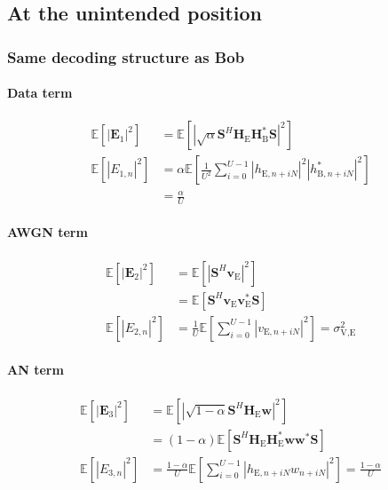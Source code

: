 \documentclass[journal,comsoc]{IEEEtran}
\newcommand{\module}[1]{\left|#1\right|}
\newcommand{\EX}[1]{\mathbb{E} \left[#1\right]}%
\newcommand{\HE}{\textbf{H}_{\text{E}}}
\newcommand{\HB}{\textbf{H}_{\text{B}}}
\newcommand{\ve}{\textbf{v}_{\text{E}}}
\newcommand{\spread}{\textbf{S}}
\newcommand{\w}{\textbf{w}}
\begin{document}
\subsection{At the unintended position}\label{sec:at-the-unintended-position-app}
\subsubsection{Same decoding structure as Bob}\label{sec:same-decoding-structure-as-bob-app}
\paragraph{Data term}\label{sec:data-term-app-1}
\begin{equation}
	\begin{split}
		\EX{|\textbf{E}_{1}|^2} &= \EX{\module{\sqrt{\alpha}\spread^H \HE\HB^* \spread}^2} \\
		\EX{|E_{1,n}|^2}&=\alpha \EX{\frac{1}{U^2} \sum_{i=0}^{U-1} \left| h_{\text{E}, n + iN} \right|^2 \left| h^*_{\text{B}, n + iN}\right|^2 } \\
		&= \frac{\alpha}{U}
	\end{split}
	\label{eq:appA:data_eve_filt0-app}
\end{equation}



\paragraph{AWGN term}\label{sec:awgn-term-app-1}
\begin{equation}
	\begin{split}
		\EX{|\textbf{E}_{2}|^2} &=  \EX{\module{\spread^H \ve}^2} \\
		&=\EX{\spread^H \ve \ve^* \spread } \\
		\EX{|E_{2,n}|^2} &= \frac{1}{U} \EX{\sum_{i=0}^{U-1} |v_{\text{E}, n + iN}|^2} = \sigma^2_{\text{V,E}}
	\end{split}
	\label{eq:appA:noise_eve_filt0-app}
\end{equation}


\paragraph{AN term}\label{sec:an-term-app-1}
\begin{equation}
	\begin{split}
		\EX{|\textbf{E}_{3}|^2} &=  \EX{\module{\sqrt{1-\alpha}\spread^H \HE \w}^2} \\
		&=(1-\alpha)\EX{\spread^H \HE\textbf{H}^*_{\text{E}} \w\w^* \spread } \\
		\EX{|E_{3,n}|^2}  &= \frac{1-\alpha}{U} \EX{\sum_{i=0}^{U-1} |h_{\text{E}, n + iN}w_{n + iN}|^2} = \frac{1-\alpha}{U}
	\end{split}
	\label{eq:appA:an_eve_filt0-app}
\end{equation}
\end{document}
